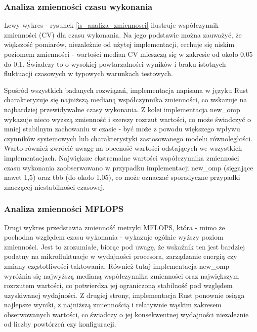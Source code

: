 \subsubsection{Analiza zmienności czasu wykonania}
Lewy wykres - rysunek \ref{is_analiza_zmiennosci} ilustruje współczynnik zmienności (CV) dla czasu wykonania. Na jego podstawie można zauważyć, że większość pomiarów, niezależnie od użytej implementacji, cechuje się niskim poziomem zmienności - wartości median CV mieszczą się w zakresie od około 0,05 do 0,1. Świadczy to o wysokiej powtarzalności wyników i braku istotnych fluktuacji czasowych w typowych warunkach testowych.

Spośród wszystkich badanych rozwiązań, implementacja napisana w języku Rust charakteryzuje się najniższą medianą współczynnika zmienności, co wskazuje na najbardziej przewidywalne czasy wykonania. Z kolei implementacja new\_omp wykazuje nieco wyższą zmienność i szerszy rozrzut wartości, co może świadczyć o mniej stabilnym zachowaniu w czasie - być może z powodu większego wpływu czynników systemowych lub charakterystyki zastosowanego modelu równoległości. Warto również zwrócić uwagę na obecność wartości odstających we wszystkich implementacjach. Największe ekstremalne wartości współczynnika zmienności czasu wykonania zaobserwowano w przypadku implementacji new\_omp (sięgające nawet 1,5) oraz tbb (do około 1,05), co może oznaczać sporadyczne przypadki znaczącej niestabilności czasowej.

\subsubsection{Analiza zmienności MFLOPS}
Drugi wykres przedstawia zmienność metryki MFLOPS, która - mimo że pochodna względem czasu wykonania - wykazuje ogólnie wyższy poziom zmienności. Jest to zrozumiałe, biorąc pod uwagę, że wskaźnik ten jest bardziej podatny na mikrofluktuacje w wydajności procesora, zarządzanie energią czy zmiany częstotliwości taktowania. Również tutaj implementacja new\_omp wyróżnia się najwyższą medianą współczynnika zmienności oraz największym rozrzutem wartości, co potwierdza jej ograniczoną stabilność pod względem uzyskiwanej wydajności. Z drugiej strony, implementacja Rust ponownie osiąga najlepsze wyniki, z najniższą zmiennością i relatywnie wąskim zakresem obserwowanych wartości, co świadczy o jej konsekwentnej wydajności niezależnie od liczby powtórzeń czy konfiguracji.

